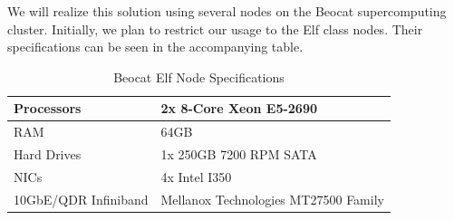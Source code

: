\documentclass[letterpaper, 12pt]{article}
\begin{document}
\begin{flushleft}
We will realize this solution using several nodes on the Beocat supercomputing cluster.  Initially, we plan to restrict our usage to the Elf class nodes. Their specifications can be seen in the accompanying table.
~\newline

\begin{table}[ht]
	\centering
	\caption{Beocat Elf Node Specifications}
	\label{nodespecs}
	\begin{tabular}{|l|l|}
		\hline
		Processors           & 2x 8-Core Xeon E5-2690               \\ \hline
		RAM                  & 64GB                                 \\ \hline
		Hard Drives          & 1x 250GB 7200 RPM SATA               \\ \hline
		NICs                 & 4x Intel I350                        \\ \hline
		10GbE/QDR Infiniband & Mellanox Technologies MT27500 Family \\ \hline
	\end{tabular}
\end{table}


\end{flushleft}
\end{document}
